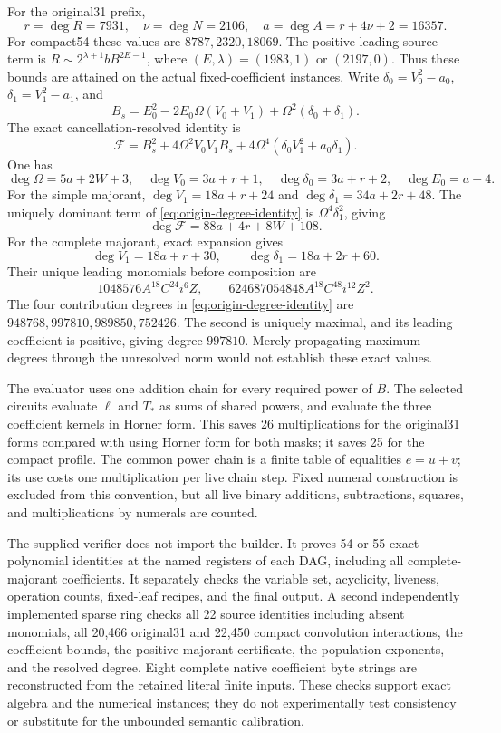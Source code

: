 For the original31 prefix,
\[
 r=\deg R=7931,\quad \nu=\deg N=2106,\quad
 a=\deg A=r+4\nu+2=16357.
\]
For compact54 these values are $8787,2320,18069$.
The positive leading source term is $R\sim 2^{\lambda+1}bB^{2E-1}$,
where $(E,\lambda)=(1983,1)$ or $(2197,0)$.
Thus these bounds are attained on the actual fixed-coefficient instances.
Write $\delta_0=V_0^2-a_0$, $\delta_1=V_1^2-a_1$, and
\[
 B_s=E_0^2-2E_0\Omega(V_0+V_1)+\Omega^2(\delta_0+\delta_1).
\]
The exact cancellation-resolved identity is
\begin{equation}
 \mathcal F=B_s^2+4\Omega^2V_0V_1B_s
                  +4\Omega^4(\delta_0V_1^2+a_0\delta_1).
 \label{eq:origin-degree-identity}
\end{equation}
One has
\[
 \deg\Omega=5a+2W+3,\quad \deg V_0=3a+r+1,\quad
 \deg\delta_0=3a+r+2,\quad \deg E_0=a+4.
\]
For the simple majorant,
$\deg V_1=18a+r+24$ and $\deg\delta_1=34a+2r+48$.
The uniquely dominant term of \eqref{eq:origin-degree-identity} is
$\Omega^4\delta_1^2$, giving
\[
                  \deg\mathcal F=88a+4r+8W+108.
\]
For the complete majorant, exact expansion gives
\[
 \deg V_1=18a+r+30,\qquad \deg\delta_1=18a+2r+60.
\]
Their unique leading monomials before composition are
\[
1048576A^{18}C^{24}i^6Z,\qquad
624687054848A^{18}C^{48}i^{12}Z^2.
\]
The four contribution degrees in \eqref{eq:origin-degree-identity} are
$948768,997810,989850,752426$.  The second is uniquely maximal, and its
leading coefficient is positive, giving degree $997810$.
Merely propagating maximum degrees through the unresolved norm would
not establish these exact values.

The evaluator uses one addition chain for every required power of $B$.
The selected circuits evaluate $\ell$ and $T_*$ as sums of shared powers,
and evaluate the three coefficient kernels in Horner form.  This saves
26 multiplications for the original31 forms compared with using Horner
form for both masks; it saves 25 for the compact profile.  The common
power chain is a finite table of equalities $e=u+v$; its use costs one
multiplication per live chain step.  Fixed numeral construction is excluded
from this convention, but all live binary additions, subtractions,
squares, and multiplications by numerals are counted.

The supplied verifier does not import the builder.  It proves 54 or 55
exact polynomial identities at the named registers of each DAG, including
all complete-majorant coefficients.  It separately checks the variable
set, acyclicity, liveness, operation counts, fixed-leaf recipes, and the
final output.  A second independently implemented sparse ring checks all
22 source identities including absent monomials, all 20,466 original31
and 22,450 compact convolution interactions, the coefficient bounds, the
positive majorant certificate, the population exponents, and the resolved
degree.  Eight complete native coefficient byte strings are reconstructed
from the retained literal finite inputs.  These checks support exact
algebra and the numerical instances; they do not experimentally test
consistency or substitute for the unbounded semantic calibration.

